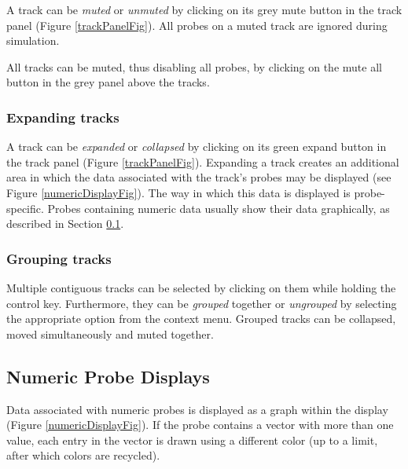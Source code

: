 \documentclass{article}
\begin{document}
A track can be {\it muted} or {\it unmuted} by clicking on its grey mute button
in the track panel (Figure \ref{trackPanelFig}). All probes on a muted track are
ignored during simulation.

All tracks can be muted, thus disabling all probes, by clicking
on the mute all button in the grey panel above the tracks.

\subsubsection{Expanding tracks}

A track can be {\it expanded} or {\it collapsed} by clicking on its green
expand button in the track panel (Figure \ref{trackPanelFig}). Expanding a track
creates an additional area in which the data associated with the
track's probes may be displayed (see Figure \ref{numericDisplayFig}). The way
in which this data is displayed is probe-specific. Probes containing
numeric data usually show their data graphically, as described in
Section \ref{numericProbeDisplaysSec}.

\subsubsection{Grouping tracks}

Multiple contiguous tracks can be selected by clicking on them while
holding the control key.  Furthermore, they can be {\it grouped} together
or {\it ungrouped} by selecting the appropriate option from the context
menu.  Grouped tracks can be collapsed, moved simultaneously and
muted together.

\subsection{Numeric Probe Displays}
\label{numericProbeDisplaysSec}

Data associated with numeric probes is displayed as a graph within the
display (Figure \ref{numericDisplayFig}). If the probe contains a vector with
more than one value, each entry in the vector is drawn using a
different color (up to a limit, after which colors are recycled).
\end{document}
